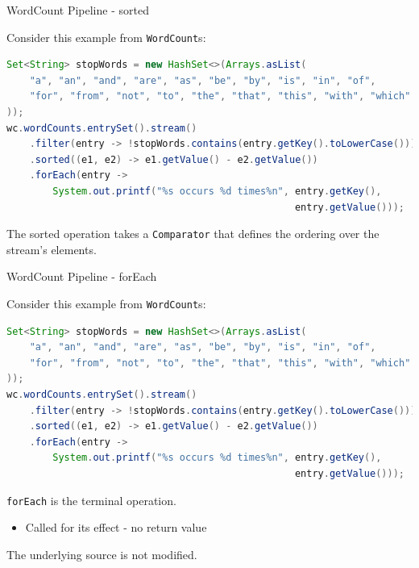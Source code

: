 \documentclass{beamer}
\begin{document}
\begin{frame}[fragile]{WordCount Pipeline - sorted}

Consider this example from {\tt WordCount}s:
\begin{lstlisting}[language=Java]
Set<String> stopWords = new HashSet<>(Arrays.asList(
    "a", "an", "and", "are", "as", "be", "by", "is", "in", "of",
    "for", "from", "not", "to", "the", "that", "this", "with", "which"
));
wc.wordCounts.entrySet().stream()
    .filter(entry -> !stopWords.contains(entry.getKey().toLowerCase()))
    .sorted((e1, e2) -> e1.getValue() - e2.getValue())
    .forEach(entry ->
        System.out.printf("%s occurs %d times%n", entry.getKey(),
                                                  entry.getValue()));
\end{lstlisting}

The sorted operation takes a {\tt Comparator} that defines the ordering over the stream's elements.

\end{frame}

\begin{frame}[fragile]{WordCount Pipeline - forEach}

Consider this example from {\tt WordCount}s:
\begin{lstlisting}[language=Java]
Set<String> stopWords = new HashSet<>(Arrays.asList(
    "a", "an", "and", "are", "as", "be", "by", "is", "in", "of",
    "for", "from", "not", "to", "the", "that", "this", "with", "which"
));
wc.wordCounts.entrySet().stream()
    .filter(entry -> !stopWords.contains(entry.getKey().toLowerCase()))
    .sorted((e1, e2) -> e1.getValue() - e2.getValue())
    .forEach(entry ->
        System.out.printf("%s occurs %d times%n", entry.getKey(),
                                                  entry.getValue()));
\end{lstlisting}

{\tt forEach} is the terminal operation.
\begin{itemize}
\item Called for its effect - no return value
\end{itemize}

The underlying source is not modified.

\end{frame}
\end{document}
